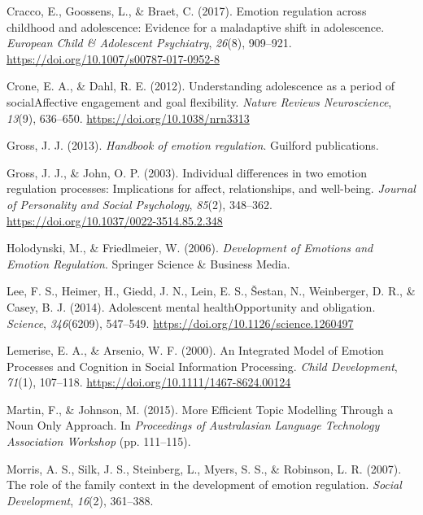 \documentclass[
  english,
  man]{apa6}
\begin{document}
\leavevmode\hypertarget{ref-craccoEmotionRegulationChildhood2017}{}%
Cracco, E., Goossens, L., \& Braet, C. (2017). Emotion regulation across childhood and adolescence: Evidence for a maladaptive shift in adolescence. \emph{European Child \& Adolescent Psychiatry}, \emph{26}(8), 909--921. \url{https://doi.org/10.1007/s00787-017-0952-8}

\leavevmode\hypertarget{ref-croneUnderstandingAdolescencePeriod2012}{}%
Crone, E. A., \& Dahl, R. E. (2012). Understanding adolescence as a period of socialAffective engagement and goal flexibility. \emph{Nature Reviews Neuroscience}, \emph{13}(9), 636--650. \url{https://doi.org/10.1038/nrn3313}

\leavevmode\hypertarget{ref-grossHandbookEmotionRegulation2013}{}%
Gross, J. J. (2013). \emph{Handbook of emotion regulation}. Guilford publications.

\leavevmode\hypertarget{ref-grossIndividualDifferencesTwo2003a}{}%
Gross, J. J., \& John, O. P. (2003). Individual differences in two emotion regulation processes: Implications for affect, relationships, and well-being. \emph{Journal of Personality and Social Psychology}, \emph{85}(2), 348--362. \url{https://doi.org/10.1037/0022-3514.85.2.348}

\leavevmode\hypertarget{ref-holodynskiDevelopmentEmotionsEmotion2006}{}%
Holodynski, M., \& Friedlmeier, W. (2006). \emph{Development of Emotions and Emotion Regulation}. Springer Science \& Business Media.

\leavevmode\hypertarget{ref-leeAdolescentMentalHealth2014}{}%
Lee, F. S., Heimer, H., Giedd, J. N., Lein, E. S., Šestan, N., Weinberger, D. R., \& Casey, B. J. (2014). Adolescent mental healthOpportunity and obligation. \emph{Science}, \emph{346}(6209), 547--549. \url{https://doi.org/10.1126/science.1260497}

\leavevmode\hypertarget{ref-lemeriseIntegratedModelEmotion2000}{}%
Lemerise, E. A., \& Arsenio, W. F. (2000). An Integrated Model of Emotion Processes and Cognition in Social Information Processing. \emph{Child Development}, \emph{71}(1), 107--118. \url{https://doi.org/10.1111/1467-8624.00124}

\leavevmode\hypertarget{ref-martinMoreEfficientTopic2015}{}%
Martin, F., \& Johnson, M. (2015). More Efficient Topic Modelling Through a Noun Only Approach. In \emph{Proceedings of Australasian Language Technology Association Workshop} (pp. 111--115).

\leavevmode\hypertarget{ref-morrisRoleFamilyContext2007}{}%
Morris, A. S., Silk, J. S., Steinberg, L., Myers, S. S., \& Robinson, L. R. (2007). The role of the family context in the development of emotion regulation. \emph{Social Development}, \emph{16}(2), 361--388.
\end{document}
